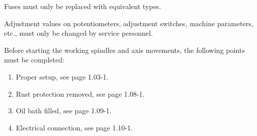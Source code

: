 

Fuses must only be replaced with equivalent types.

Adjustment values on potentiometers, adjustment switches, machine parameters, etc., must only be changed by service personnel.


Before starting the working spindles and axis movements, the following points must be completed:

\begin{enumerate}
    \item Proper setup, see page 1.03-1.
    \item Rust protection removed, see page 1.08-1.
    \item Oil bath filled, see page 1.09-1.
    \item Electrical connection, see page 1.10-1.
\end{enumerate}